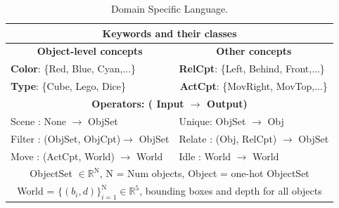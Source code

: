 \begin{table}
    \begin{tabular}{|p{0.01cm}|p{0.01cm}|p{0.08cm}|p{0.08cm}|}
        \hline
        \multicolumn{4}{|c|}{\textbf{Keywords and their classes}}\\
        \hline
        
         \multicolumn{2}{|c|}{\textbf{Object-level concepts}}& \multicolumn{2}{c|}{\textbf{Other concepts}} \\
         \multicolumn{2}{|l|}{\textbf{Color}: \{Red, Blue, Cyan,...\}}& \multicolumn{2}{l|}{\textbf{RelCpt}: \{Left, Behind, Front,...\}} \\
         \multicolumn{2}{|l|}{\textbf{Type}: \{Cube, Lego, Dice\}} & \multicolumn{2}{c|}{\textbf{ActCpt}:  \{MovRight, MovTop,...\}} \\
    \hline
    \hline
    \multicolumn{4}{|c|}{\textbf{Operators: ( Input $\rightarrow$ Output)}}\\
    \hline
    \multicolumn{2}{|l|}{Scene : None $\rightarrow$ ObjSet} & \multicolumn{2}{l|}{Unique: ObjSet $\rightarrow$ Obj}\\
     \multicolumn{2}{|l|}{Filter : (ObjSet, ObjCpt)$ \rightarrow$ ObjSet} & \multicolumn{2}{l|}{Relate  : (Obj, RelCpt) $\rightarrow$ ObjSet}\\
     \multicolumn{2}{|l|}{ Move : (ActCpt, World) $\rightarrow$ World} & \multicolumn{2}{l|}{ Idle :  World $\rightarrow$ World}\\
    \hline
    \multicolumn{4}{|c|}{ObjectSet $\in \mathbb{R}^{\text{N}}$, N = Num objects, Object = one-hot ObjectSet}\\
    \multicolumn{4}{|c|}{World = $\{(b_i,d)\}_{i=1}^\text{N} \in \mathbb{R}^5$, bounding boxes and depth for all objects }\\
    \hline
        \end{tabular}
    \caption{Domain Specific Language.}
    \label{table:dsl}
    \vspace{-0.5cm}
\end{table}
